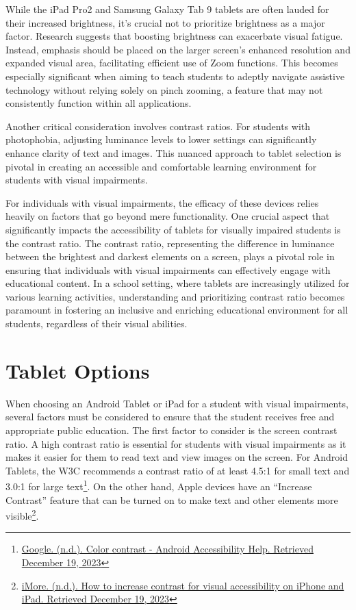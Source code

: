While the iPad Pro2 and Samsung Galaxy Tab 9 tablets are often lauded for their increased brightness, it's crucial not to prioritize brightness as a major factor. Research suggests that boosting brightness can exacerbate visual fatigue. Instead, emphasis should be placed on the larger screen's enhanced resolution and expanded visual area, facilitating efficient use of Zoom functions. This becomes especially significant when aiming to teach students to adeptly navigate assistive technology without relying solely on pinch zooming, a feature that may not consistently function within all applications.

Another critical consideration involves contrast ratios. For students with photophobia, adjusting luminance levels to lower settings can significantly enhance clarity of text and images. This nuanced approach to tablet selection is pivotal in creating an accessible and comfortable learning environment for students with visual impairments.

For individuals with visual impairments, the efficacy of these devices relies heavily on factors that go beyond mere functionality. One crucial aspect that significantly impacts the accessibility of tablets for visually impaired students is the contrast ratio. The contrast ratio, representing the difference in luminance between the brightest and darkest elements on a screen, plays a pivotal role in ensuring that individuals with visual impairments can effectively engage with educational content. In a school setting, where tablets are increasingly utilized for various learning activities, understanding and prioritizing contrast ratio becomes paramount in fostering an inclusive and enriching educational environment for all students, regardless of their visual abilities.


\pagebreak	\hypertarget{tablet-options}{}\section{Tablet Options}\label{tab:tablet-options}
When choosing an Android Tablet or iPad for a student with visual impairments, several factors must be considered to ensure that the student receives free and appropriate public education. The first factor to consider is the screen contrast ratio. A high contrast ratio is essential for students with visual impairments as it makes it easier for them to read text and view images on the screen. For Android Tablets, the W3C recommends a contrast ratio of at least 4.5:1 for small text and 3.0:1 for large text\footnote{\raggedright \href{https://support.google.com/accessibility/android/answer/7158390?hl=en}{Google. (n.d.). Color contrast - Android Accessibility Help. Retrieved December 19, 2023}}. On the other hand, Apple devices have an “Increase Contrast” feature that can be turned on to make text and other elements more visible\footnote{\raggedright \href{https://www.imore.com/how-increase-contrast-visual-accessibility-iphone-and-ipad}{iMore. (n.d.). How to increase contrast for visual accessibility on iPhone and iPad. Retrieved December 19, 2023}}.

